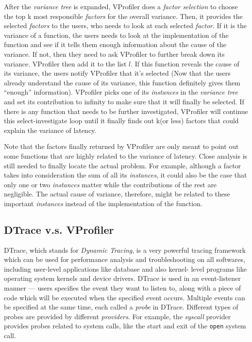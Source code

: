 After the \textit{variance tree} is expanded, VProfiler does a \textit{factor
selection} to choose the top k most responsible \textit{factors} for the
overall variance. Then, it provides the selected \textit{factors} to the
users, who needs to look at each selected \textit{factor}. If it is the
variance of a function, the users needs to look at the implementation of the 
function and see if it tells them enough information about the cause of the 
variance. If not, then they need to ask VProfiler to further break down its
variance. VProfiler then add it to the list $l$. If this function reveals the
cause of its variance, the users notify VProfiler that it's selected
(Now that the users already understand the cause of its variance, this
function definitely gives them ``enough'' information). VProfiler picks one of
its \textit{instances} in the \textit{variance tree} and set its contribution
to infinity to make sure that it will finally be selected. If there is any
function that needs to be further investigated, VProfiler will continue
this select-investigate loop until it finally finds out k(or less)
factors that could explain the variance of latency.

Note that the factors finally returned by VProfiler are only meant to point out
some functions that are highly related to the variance of latency. Close
analysis is still needed to finally locate the actual problem. For example,
although a factor takes into consideration the sum of all its 
\textit{instances}, it could also be the case that only one or two
\textit{instances} matter while the contributions of the rest are negligible.
The actual cause of variance, therefore, might be related to these important
\textit{instances} instead of the implementation of the function.

\subsection{DTrace v.s. VProfiler}
DTrace, which stands for \textit{Dynamic Tracing}, is a very powerful tracing
framework which can be used for performance analysis and troubleshooting on all
softwares, including user-level applications like database and also kernel-
level programs like operating system kernels and device drivers. DTrace is used 
in an event-listener manner --- users specifies the event they want to listen
to, along with a piece of code which will be executed when the specified event
occurs. Multiple events can be specified at the same time, each called a
\textit{probe} in DTrace. Different types of probes are provided by different
\textit{providers}. For example, the \textit{syscall} provider provides probes
related to system calls, like the start and exit of the \texttt{open} system
call.


